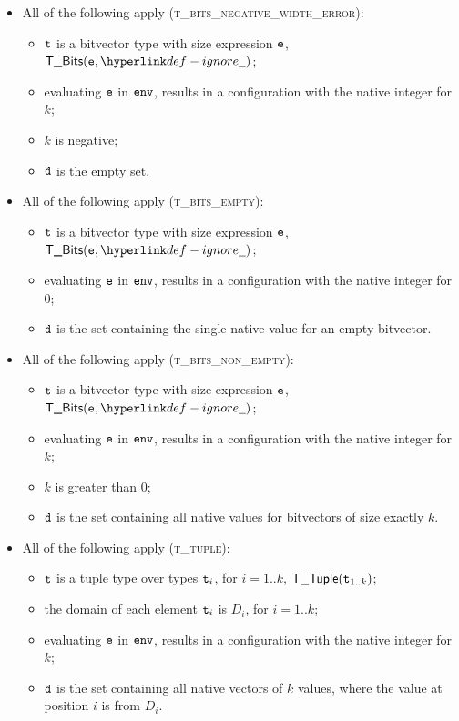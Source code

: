 \documentclass{book}
\begin{document}
\begin{itemize}
  \item All of the following apply (\textsc{t\_bits\_negative\_width\_error}):
  \begin{itemize}
    \item $\texttt{t}$ is a bitvector type with size expression $\texttt{e}$, $\TBits(\ve, \Ignore)$;
    \item evaluating $\texttt{e}$ in $\texttt{env}$, results in a configuration with the native integer for $k$;
    \item $k$ is negative;
    \item $\texttt{d}$ is the empty set.
  \end{itemize}

  \item All of the following apply (\textsc{t\_bits\_empty}):
  \begin{itemize}
    \item $\texttt{t}$ is a bitvector type with size expression $\texttt{e}$, $\TBits(\ve, \Ignore)$;
    \item evaluating $\texttt{e}$ in $\texttt{env}$, results in a configuration with the native integer for $0$;
    \item $\texttt{d}$ is the set containing the single native value for an empty bitvector.
  \end{itemize}

  \item All of the following apply (\textsc{t\_bits\_non\_empty}):
  \begin{itemize}
    \item $\texttt{t}$ is a bitvector type with size expression $\texttt{e}$, $\TBits(\ve, \Ignore)$;
    \item evaluating $\texttt{e}$ in $\texttt{env}$, results in a configuration with the native integer for $k$;
    \item $k$ is greater than $0$;
    \item $\texttt{d}$ is the set containing all native values for bitvectors of size exactly $k$.
  \end{itemize}

  \item All of the following apply (\textsc{t\_tuple}):
  \begin{itemize}
    \item $\texttt{t}$ is a tuple type over types $\texttt{t}_i$, for $i=1..k$, $\textsf{T\_Tuple}(\texttt{t}_{1..k})$;
    \item the domain of each element $\texttt{t}_i$ is $D_i$, for $i=1..k$;
    \item evaluating $\texttt{e}$ in $\texttt{env}$, results in a configuration with the native integer for $k$;
    \item $\texttt{d}$ is the set containing all native vectors of $k$ values, where the value at position $i$
    is from $D_i$.
  \end{itemize}


\end{itemize}
\end{document}
